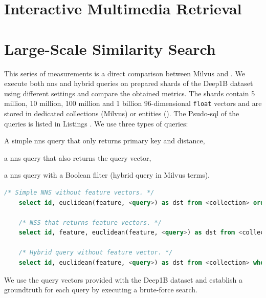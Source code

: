 \section{Interactive Multimedia Retrieval}


\section{Large-Scale Similarity Search}
This series of measurements is a direct comparison between Milvus and \cottontail{}. We execute both \acrshort{nns} and hybrid queries on prepared shards of the Deep1B \cite{Babenko:2016Efficient} dataset using different settings and compare the obtained metrics. The shards contain 5 million, 10 million, 100 million and 1 billion $96$-dimensional \texttt{float} vectors and are stored in dedicated collections (Milvus) or entities (\cottontail). The Psudo-\acrshort{sql} of the queries is listed in Listings . We use three types of queries:
\begin{enumerate*}[label=(\roman*)]
    \item A simple \acrshort{nns} query that only returns primary key and distance,
    \item a \acrshort{nns} query that also returns the query vector,
    \item a \acrshort{nns} query with a Boolean filter (hybrid query in Milvus terms).
\end{enumerate*}

\begin{lstlisting}[language=SQL, caption={Pseudo-SQL of the queries executed for this measurement.}, label=listing:big_nns_query, numbers=none]
    /* Simple NNS without feature vectors. */
    select id, euclidean(feature, <query>) as dst from <collection> order by dst limit 1000
    
    /* NSS that returns feature vectors. */
    select id, feature, euclidean(feature, <query>) as dst from <collection> order by dst limit 1000

    /* Hybrid query without feature vector. */
    select id, euclidean(feature, <query>) as dst from <collection> where category = <category> order by dst limit 1000
\end{lstlisting}

We use the query vectors provided with the Deep1B dataset and establish a groundtruth for each query by executing a brute-force search.

